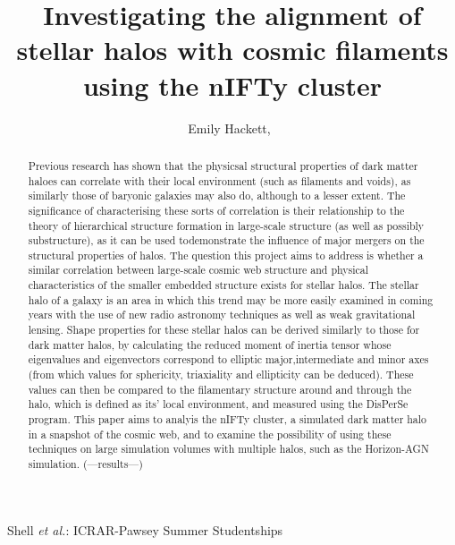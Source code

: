 \documentclass[journal]{IEEEtran}
\begin{document}
\title{Investigating the alignment of stellar halos with cosmic filaments using the nIFTy cluster}

\author{Emily Hackett,~}%
	
%
{Shell \MakeLowercase{\textit{et al.}}: ICRAR-Pawsey Summer Studentships}

\maketitle

\begin{abstract}
	Previous research has shown that the physicsal structural properties of dark matter haloes can correlate with their local environment (such as filaments and voids), as similarly those of baryonic galaxies may also do, although to a lesser extent. The significance of characterising these sorts of correlation is their relationship to the theory of hierarchical structure formation in large-scale structure (as well as possibly substructure), as it can be used todemonstrate the influence of major mergers on the structural properties of halos. The question this project aims to address is whether a similar correlation between large-scale cosmic web structure and physical characteristics of the smaller embedded structure exists for stellar halos. The stellar halo of a galaxy is an area in which this trend may be more easily examined in coming years with the use of new radio astronomy techniques as well as weak gravitational lensing. Shape properties for these stellar halos can be derived similarly to those for dark matter halos, by calculating the reduced moment of inertia tensor whose eigenvalues and eigenvectors correspond to elliptic major,intermediate and minor axes (from which values for sphericity, triaxiality and ellipticity can be deduced). These values can then be compared to the filamentary structure around and through the halo, which is defined as its' local environment, and measured using the DisPerSe program. This paper aims to analyis the nIFTy cluster, a simulated dark matter halo in a snapshot of the cosmic web, and to examine the possibility of using these techniques on large simulation volumes with multiple halos, such as the Horizon-AGN simulation. 
	(---results---)
\end{abstract}
\end{document}
